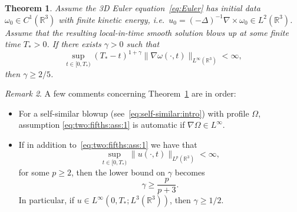 \documentclass[11pt,reqno]{amsproc}
\numberwithin{equation}{section}
\newtheorem{theorem}{Theorem}[section]
\theoremstyle{remark}
\newtheorem{remark}[theorem]{Remark}
\begin{document}
\begin{theorem}
\label{thm:two:fifths}
Assume the 3D Euler equation~\eqref{eq:Euler} has initial data $\omega_0 \in C^1(\mathbb{R}^3)$ with finite kinetic energy, i.e.~$u_0 = (-\Delta)^{-1} \nabla \times \omega_0 \in L^2(\mathbb{R}^3)$. Assume that the resulting local-in-time smooth solution blows up at some finite time $T_*>0$. If there exists $\gamma>0$ such that
\begin{equation}
\sup_{t\in [0,T_*)} (T_*-t)^{1+\gamma} \|\nabla \omega(\cdot,t)\|_{L^\infty(\mathbb{R}^3)} < \infty,
\label{eq:two:fifths:ass:1}
\end{equation}
then $\gamma \geq 2/5$. 
\end{theorem}
\begin{remark}
\label{rem:two:fifths}
A few comments concerning Theorem~\ref{thm:two:fifths} are in order:
\begin{itemize}[leftmargin=2em] 
\item[(a)] For a self-similar blowup (see~\eqref{eq:self-similar:intro}) with profile $\Omega$, assumption \eqref{eq:two:fifths:ass:1} is automatic if $\nabla \Omega \in L^\infty$.

\item[(b)] If in addition to~\eqref{eq:two:fifths:ass:1} we have that 
\begin{equation}
\label{eq:two:fifths:ass:2}
\sup_{t\in[0,T_*)} \|u(\cdot,t)\|_{L^p(\mathbb{R}^3)} < \infty,
\end{equation}
for some $p\geq 2$, 
then the lower bound on $\gamma$ becomes 
\[
\gamma \geq \frac{p}{p+3}.
\]
In particular, if $u \in L^\infty(0,T_*;L^3(\mathbb{R}^3))$, then $\gamma \geq 1/2$.
\end{itemize}
\end{remark}
\end{document}
